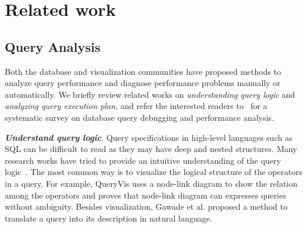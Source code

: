 \section{Related work}
\subsection{Query Analysis}



Both the database and visualization communities have proposed methods to analyze query performance and diagnose performance problems manually or automatically. We briefly review related works on \textit{understanding query logic} and \textit{analyzing query execution plan}, and refer the interested readers to~\cite{gathani2020debugging} for a systematic survey on database query debugging and performance analysis.



\emph{\textbf{Understand query logic}}. Query specifications in high-level languages such as SQL can be difficult to read as they may have deep and nested structures. Many research works have tried to provide an intuitive understanding of the query logic~\cite{}. The most common way is to visualize the logical structure of the operators in a query. For example, QueryVis uses a node-link diagram to show the relation among the operators and proves that node-link diagram can expresses queries without ambiguity. Besides visualization, Gawade et al. proposed a method to translate a query into its description in natural language. 


